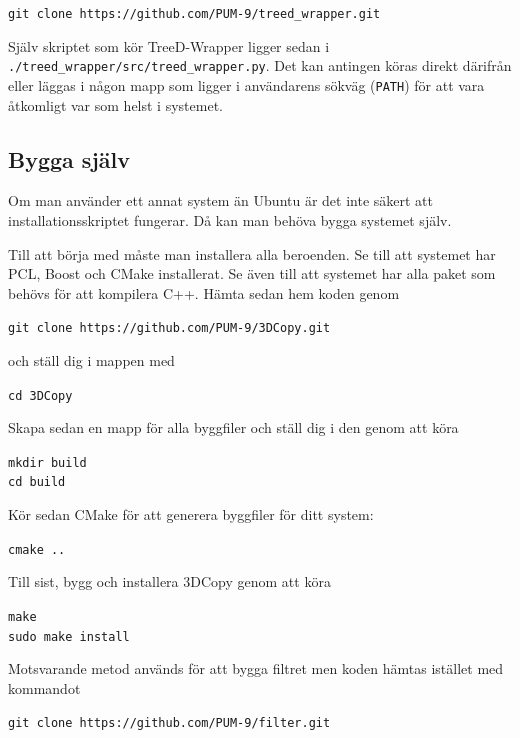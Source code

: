 \documentclass[a4paper,titlepage,12pt]{article}
\begin{document}
	\texttt{git clone https://github.com/PUM-9/treed\_wrapper.git}
	
	Själv skriptet som kör TreeD-Wrapper ligger sedan i \texttt{./treed\_wrapper/src/treed\_wrapper.py}. Det kan antingen köras direkt därifrån eller läggas i någon mapp som ligger i användarens sökväg (\texttt{PATH}) för att vara åtkomligt var som helst i systemet.
	
\subsection{Bygga själv}
	Om man använder ett annat system än Ubuntu är det inte säkert att installationsskriptet fungerar. Då kan man behöva bygga systemet själv.
	
	Till att börja med måste man installera alla beroenden. Se till att systemet har PCL, Boost och CMake installerat. Se även till att systemet har alla paket som behövs för att kompilera C++. Hämta sedan hem koden genom
	
	\texttt{git clone https://github.com/PUM-9/3DCopy.git}
	
	och ställ dig i mappen med
	
	\texttt{cd 3DCopy}
	
	Skapa sedan en mapp för alla byggfiler och ställ dig i den genom att köra
	
	\texttt{mkdir build \\
	cd build}
	
	Kör sedan CMake för att generera byggfiler för ditt system:
	
	\texttt{cmake ..}
	
	Till sist, bygg och installera 3DCopy genom att köra
	
	\texttt{make \\
	sudo make install}

	Motsvarande metod används för att bygga filtret men koden hämtas istället med kommandot
	
	\texttt{git clone https://github.com/PUM-9/filter.git}
\newpage
\end{document}
